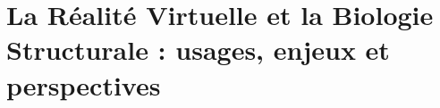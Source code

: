 
\chapter[La Réalité Virtuelle et la Biologie Structurale : usages, enjeux et perspectives]{La Réalité Virtuelle et la Biologie Structurale : usages, enjeux et perspectives}
\label{Sec:RV}
\minitoc
\cleardoublepage







